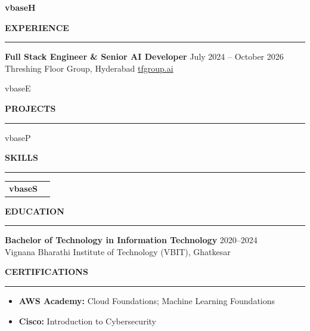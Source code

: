 \documentclass{resume}
\renewenvironment{rSection}[1]{
    \vspace{8pt}
    \noindent
    {\bfseries\MakeUppercase{#1}}
    \par
    \vspace{-3.5pt}
    \noindent\rule{\textwidth}{0.4pt}
    \par
    \vspace{4pt}
}{
    \vspace{3pt}
}
\def\Variant{base}
\newcommand{\Headline}{\csname v\Variant H\endcsname}
\newcommand{\ExpList}{\csname v\Variant E\endcsname}
\newcommand{\ProjList}{\csname v\Variant P\endcsname}
\newcommand{\SkillOrder}{\csname v\Variant S\endcsname}
\begin{document}
\sloppy

\begin{center}\large\textbf{\Headline}\end{center}

\begin{rSection}{Experience}
\textbf{Full Stack Engineer \& Senior AI Developer} \hfill July 2024 -- October 2026 \\
Threshing Floor Group, Hyderabad \hfill \href{https://tfgroup.ai/en}{tfgroup.ai}
\begin{itemize}
\ExpList
\end{itemize}
\end{rSection}

\begin{rSection}{Projects}
\begin{itemize}
\ProjList
\end{itemize}
\end{rSection}

\begin{rSection}{Skills}
\begin{tabularx}{\textwidth}{@{}>{\bfseries}p{1.6in}X@{}}
\SkillOrder
\end{tabularx}
\end{rSection}

\begin{rSection}{Education}
\textbf{Bachelor of Technology in Information Technology} \hfill 2020--2024 \\
Vignana Bharathi Institute of Technology (VBIT), Ghatkesar
\end{rSection}

\begin{rSection}{Certifications}
\begin{itemize}
\item \textbf{AWS Academy:} Cloud Foundations; Machine Learning Foundations
\item \textbf{Cisco:} Introduction to Cybersecurity
\end{itemize}
\end{rSection}
\end{document}
